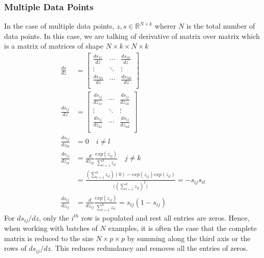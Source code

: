 \documentclass[../../deep_learning_notes.tex]{subfiles}
\begin{document}
\subsubsection*{Multiple Data Points}
In the case of multiple data points, $z, s \in \mathbb{R}^{N \times k}$ wherer $N$ is the total number of data points. In this case, we are talking of derivative of matrix over matrix which is a matrix of matrices of shape $N \times k \times N \times k$
\begin{align*}
    \frac{ds}{dz} &= \begin{bmatrix}
        \frac{ds_{11}}{dz} &\cdots &\frac{ds_{1k}}{dz}\\
        \vdots &\ddots &\vdots\\
        \frac{ds_{N1}}{dz} &\cdots &\frac{ds_{Nk}}{dz}\\
    \end{bmatrix}\\
    \frac{ds_{ij}}{dz} &= \begin{bmatrix}
        \frac{ds_{ij}}{dz_{11}} &\cdots &\frac{ds_{ij}}{dz_{1k}}\\
        \vdots &\ddots &\vdots\\
        \frac{ds_{ij}}{dz_{k1}} &\cdots &\frac{ds_{ij}}{dz_{nk}}\\
    \end{bmatrix}\\
    \frac{ds_{ij}}{dz_{lk}} &= 0 \quad i \neq l\\
    \frac{ds_{ij}}{dz_{ik}} &= \frac{d}{dz_{ik}} \frac{exp(z_{ij})}{\sum_{l=1}^{k}z_{il}} \quad j \neq k\\
    &= \frac{(\sum_{l=1}^{k}z_{il})(0) - exp(z_{ij})exp(z_{il})}{\big( (\sum_{l=1}^{k}z_{il})^{2} \big)}
    = -s_{ij}s_{il}\\
    \frac{ds_{ij}}{dz_{ij}} &= \frac{d}{dz_{ij}} \frac{exp(z_{ij})}{\sum_{l=1}^{k}z_{il}}
    = s_{ij}(1 - s_{ij})
\end{align*}
For $ds_{ij}/dz$, only the $i^{th}$ row is populated and rest all entries are zeros. Hence, when working with batches of $N$ examples, it is often the case that the complete matrix is reduced to the size  $N \times p \times p$ by summing along the third axis or the rows of $ds_{ij}/dz$. This reduces redundancy and removes all the entries of zeros.\newline
\end{document}
